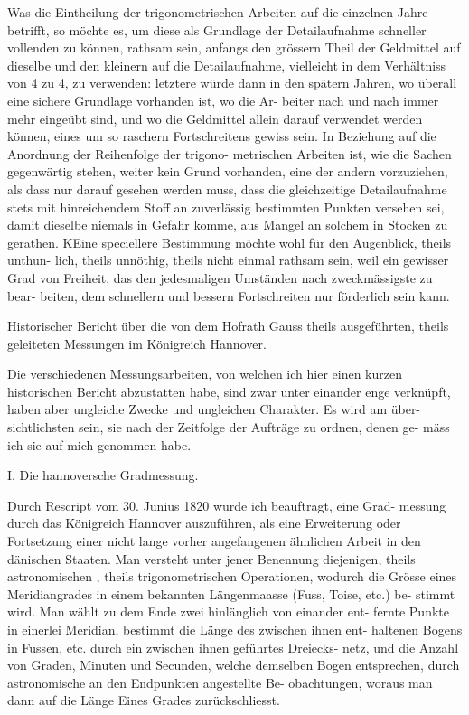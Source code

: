 \documentclass[12pt,a4paper]{article}
\theoremstyle{plain}
\theoremstyle{definition}
\theoremstyle{remark}
\begin{document}
\noindent
Was die Eintheilung der trigonometrischen Arbeiten auf die einzelnen
Jahre betrifft, so möchte es, um diese als Grundlage der Detailaufnahme
schneller vollenden zu können, rathsam sein, anfangs den grössern Theil der
Geldmittel auf dieselbe und den kleinern auf die Detailaufnahme, vielleicht
in dem Verhältniss von 4 zu 4, zu verwenden: letztere würde dann in den
spätern Jahren, wo überall eine sichere Grundlage vorhanden ist, wo die Ar-
beiter nach und nach immer mehr eingeübt sind, und wo die Geldmittel
allein darauf verwendet werden können, eines um so raschern Fortschreitens
gewiss sein. In Beziehung auf die Anordnung der Reihenfolge der trigono-
metrischen Arbeiten ist, wie die Sachen gegenwärtig stehen, weiter kein
Grund vorhanden, eine der andern vorzuziehen, als dass nur darauf gesehen
werden muss, dass die gleichzeitige Detailaufnahme stets mit hinreichendem
Stoff an zuverlässig bestimmten Punkten versehen sei, damit dieselbe niemals
in Gefahr komme, aus Mangel an solchem in Stocken zu gerathen. KEine
speciellere Bestimmung möchte wohl für den Augenblick, theils unthun-
lich, theils unnöthig, theils nicht einmal rathsam sein, weil ein gewisser Grad
von Freiheit, das den jedesmaligen Umständen nach zweckmässigste zu bear-
beiten, dem schnellern und bessern Fortschreiten nur förderlich sein kann.

\noindent

\noindent
Historischer Bericht
über die von dem Hofrath Gauss theils ausgeführten, theils geleiteten
Messungen im Königreich Hannover.

\noindent
Die verschiedenen Messungsarbeiten, von welchen ich hier einen kurzen
historischen Bericht abzustatten habe, sind zwar unter einander enge verknüpft,
haben aber ungleiche Zwecke und ungleichen Charakter. Es wird am über-
sichtlichsten sein, sie nach der Zeitfolge der Aufträge zu ordnen, denen ge-
mäss ich sie auf mich genommen habe.

\noindent
I. Die hannoversche Gradmessung.

\noindent
Durch Rescript vom 30. Junius 1820 wurde ich beauftragt, eine Grad-
messung durch das Königreich Hannover auszuführen, als eine Erweiterung
oder Fortsetzung einer nicht lange vorher angefangenen ähnlichen Arbeit in
den dänischen Staaten. Man versteht unter jener Benennung diejenigen, theils
astronomischen , theils trigonometrischen Operationen, wodurch die Grösse
eines Meridiangrades in einem bekannten Längenmaasse (Fuss, Toise, etc.) be-
stimmt wird. Man wählt zu dem Ende zwei hinlänglich von einander ent-
fernte Punkte in einerlei Meridian, bestimmt die Länge des zwischen ihnen ent-
haltenen Bogens in Fussen, etc. durch ein zwischen ihnen geführtes Dreiecks-
netz, und die Anzahl von Graden, Minuten und Secunden, welche demselben
Bogen entsprechen, durch astronomische an den Endpunkten angestellte Be-
obachtungen, woraus man dann auf die Länge Eines Grades zurückschliesst.
\end{document}
